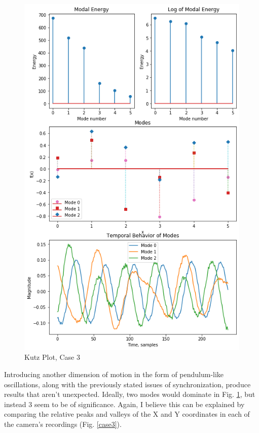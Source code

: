 \documentclass[journal]{IEEEtran}
\begin{document}
\begin{figure}
	\centerline{\includegraphics[width=\columnwidth]{kutz3.png}}
	\caption{Kutz Plot, Case 3}
	\label{kutz3}
\end{figure}

Introducing another dimension of motion in the form of pendulum-like oscillations, along with
the previously stated issues of synchronization, produce results that aren't unexpected. Ideally,
two modes would dominate in Fig. \ref{kutz3}, but instead 3 seem to be of significance. Again,
I believe this can be explained by comparing the relative peaks and valleys of the X and Y
coordinates in each of the camera's recordings (Fig. \ref{case3}).
\end{document}
